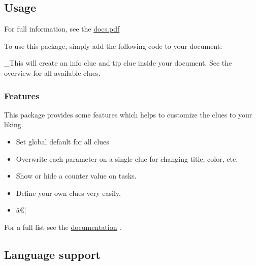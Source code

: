 \subsection{Usage}\label{usage}

For full information, see the
\href{https://github.com/jomaway/typst-gentle-clues/blob/main/docs.pdf}{docs.pdf}

To use this package, simply add the following code to your document:

\begin{Shaded}
\begin{Highlighting}[]


\end{Highlighting}
\end{Shaded}

\_This will create an info clue and tip clue inside your document. See
the overview for all available clues.

\subsubsection{Features}\label{features}

This package provides some features which helps to customize the clues
to your liking.

\begin{itemize}
\tightlist
\item
  Set global default for all clues
\item
  Overwrite each parameter on a single clue for changing title, color,
  etc.
\item
  Show or hide a counter value on tasks.
\item
  Define your own clues very easily.
\item
  â€¦
\end{itemize}

For a full list see the
\href{https://github.com/jomaway/typst-gentle-clues/blob/main/docs.pdf}{documentation}
.

\subsection{Language support}\label{language-support}

